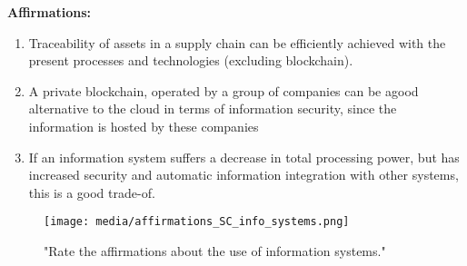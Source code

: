 \textbf{Affirmations: }
\begin{enumerate}
\item Traceability of assets in a supply
chain can be efficiently achieved
with the present processes and
technologies (excluding blockchain).
\item A private blockchain, operated by a group
of companies can be agood alternative to 
the cloud in terms of information security,
since the information is hosted by these
companies
\item If an information system suffers a 
decrease in total processing power, but
has increased security and automatic
information integration with other
systems, this is a good trade-of.
\end{enumerate}


\begin{figure}[h]
\centering
\texttt{[image: media/affirmations\_SC\_info\_systems.png]}
\caption["Rate the affirmations about the use of information systems."]{"Rate the affirmations about the use of information systems."}
\label{fig:affirmations_SC_info_systems}
\end{figure}



